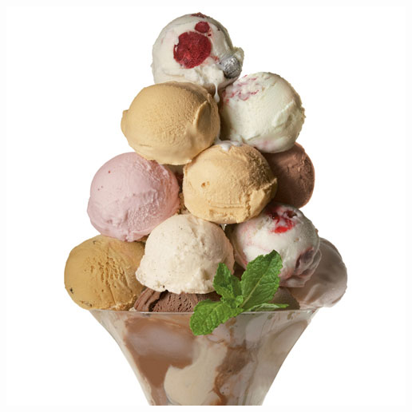\documentclass{article}
\begin{document}
\begin{titlepage}
\includegraphics[width=\textwidth]{ice_cream.jpg}

\end{titlepage}

\pagebreak


\end{document}
